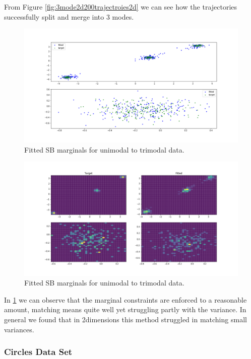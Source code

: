 \documentclass[a4paper,12pt,twoside,openright]{report}
\theoremstyle{definition}
\begin{document}
From Figure \ref{fig:3mode2d200trajectroies2d}  we can see how the trajectories successfully split and merge into 3 modes.
\begin{figure}
    \centering
    \includegraphics[scale=0.4,trim={4.3cm 1cm 2.5cm 0}, clip]{images/GP/2d_3mode_GP_means_3.3_3.6_0.7_std_0.1_scatter_200_.png}
    \caption{ Fitted SB marginals for unimodal to trimodal data.  }
    \label{fig:3mode2d200}
\end{figure}
\begin{figure}
    \centering
    \includegraphics[scale=0.4,trim={4.3cm 1cm 2.5cm 0}, clip]{images/GP/2d_3mode_GP_means_3.3_3.6_0.7_std_0.1_hist_200.png}
    \caption{ Fitted SB marginals for unimodal to trimodal data.  }
    \label{fig:3mode2d200hist}
\end{figure}
In \ref{fig:3mode2d200} we can observe that the marginal constraints are enforced to a reasonable amount, matching means quite well yet struggling partly with the variance. In general we found that in 2dimensions this method struggled in matching small variances.

\subsubsection{Circles Data Set}
\end{document}
